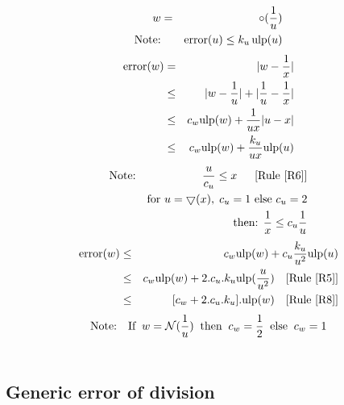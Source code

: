 \documentclass[12pt]{amsart}
\def\n{\textnormal}
\def\minf{\bigtriangledown}
\def\ulp{{\rm ulp}}
\def\N{{\mathcal N}}
\newcommand{\U}[1]{\quad \mbox{[Rule~\ref{#1}]}}
\DeclareMathOperator{\error}{error}
\begin{document}
\begin{eqnarray}\nonumber
w&=&\circ(\frac{1}{u}) \\\nonumber
\textnormal{Note:}&& \error(u) \leq k_u \, \ulp(u)
\end{eqnarray}
\begin{eqnarray}\nonumber
\error(w)& = &|w - \frac{1}{x}| \\\nonumber
& \leq &|w - \frac{1}{u}| +|\frac{1}{u} - \frac{1}{x}| \\\nonumber
& \leq & c_w \ulp(w) + \frac{1}{ux}|u-x| \\\nonumber
& \leq & c_w \ulp(w) + \frac{k_u}{ux} \ulp(u)
\end{eqnarray}
\begin{eqnarray}\nonumber
\textnormal{Note:}&& \frac{u}{c_u} \leq x\;\; \U{R6}\\\nonumber
&&\n{for } u=\minf(x),\;c_u=1 \n{ else } c_u=2\\\nonumber
&& \n{then: } \frac{1}{x} \leq c_u \frac{1}{u}
\end{eqnarray}
\begin{eqnarray}\nonumber
\error(w)& \leq & c_w \ulp(w) + c_u\frac{k_u}{u^2} \ulp(u)\\\nonumber
& \leq & c_w \ulp(w) + 2.c_u.k_u \ulp(\frac{u}{u^2}) \U{R5}\\\nonumber
& \leq & [c_w + 2.c_u.k_u].\ulp(w) \U{R8}
\end{eqnarray}
\begin{eqnarray}\nonumber
\textnormal{Note:}&&\textnormal{If}\;\; w=\N(\frac{1}{u}) \;\;\textnormal{then}\;\; c_w =\frac{1}{2} \;\;\textnormal{else}\;\; c_w =1\\\nonumber\end{eqnarray}

\subsection{Generic error of division}\label{generic:div}
\end{document}

